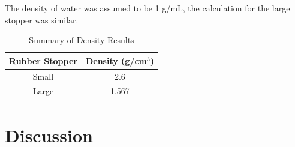 \documentclass{article}
\begin{document}
The density of water was assumed to be 1 g/mL, the calculation for the large stopper was similar.
\begin{table}[h!]
    \centering
    \caption{Summary of Density Results}
    \label{tab:results-summary}
    \vspace{0.125 in}
    \begin{tabular}{|c|c|}
        \hline
        \textbf{Rubber Stopper} & \textbf{Density (g/cm$^3$)} \\
        \hline
        Small & 2.6 \\
        \hline
        Large & 1.567 \\
        \hline
    \end{tabular}
\end{table}

\section{Discussion}
\end{document}
